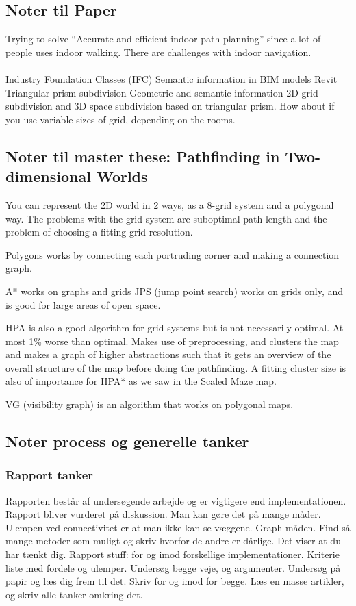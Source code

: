 \subsection{Noter til Paper}
Trying to solve “Accurate and efficient indoor path planning” since a lot of 
people uses indoor walking. There are challenges with indoor navigation.
\\\\
Industry Foundation Classes (IFC)
Semantic information in BIM models
Revit
Triangular prism subdivision
Geometric and semantic information
2D grid subdivision and 3D space subdivision based on triangular prism.
How about if you use variable sizes of grid, depending on the rooms.


\subsection{Noter til master these: Pathfinding in Two-dimensional
Worlds }

You can represent the 2D world in 2 ways, as a 8-grid system and a polygonal way. 
The problems with the grid system are suboptimal path length and the problem of choosing a fitting grid resolution.

Polygons works by connecting each portruding corner and making a connection graph.

A* works on graphs and grids
JPS (jump point search) works on grids only, and is good for large areas of open space.

HPA is also a good algorithm for grid systems but is not necessarily optimal. At most 1\% worse than optimal. 
Makes use of preprocessing, and clusters the map and makes a graph of higher abstractions such that it gets an overview 
of the overall structure of the map before doing the pathfinding.
A fitting cluster size is also of importance for HPA* as we saw in the Scaled Maze map.

VG (visibility graph)
is an algorithm that works on polygonal maps.



\subsection{Noter process og generelle tanker}
\subsubsection{Rapport tanker}
Rapporten består af undersøgende arbejde og er vigtigere end implementationen.
Rapport bliver vurderet på diskussion.
Man kan gøre det på mange måder.
Ulempen ved connectivitet er at man ikke kan se væggene. Graph måden.
Find så mange metoder som muligt og skriv hvorfor de andre er dårlige.
Det viser at du har tænkt dig.
Rapport stuff: for og imod forskellige implementationer.
Kriterie liste med fordele og ulemper.
Undersøg begge veje, og argumenter.
Undersøg på papir og læs dig frem til det. Skriv for og imod for begge.
Læs en masse artikler, og skriv alle tanker omkring det.

